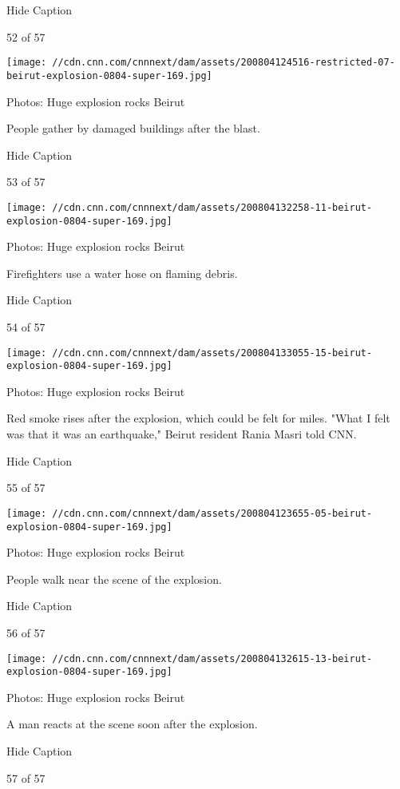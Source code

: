 Hide Caption

52 of 57

\texttt{[image: //cdn.cnn.com/cnnnext/dam/assets/200804124516-restricted-07-beirut-explosion-0804-super-169.jpg]}

Photos: Huge explosion rocks Beirut

People gather by damaged buildings after the blast.

Hide Caption

53 of 57

\texttt{[image: //cdn.cnn.com/cnnnext/dam/assets/200804132258-11-beirut-explosion-0804-super-169.jpg]}

Photos: Huge explosion rocks Beirut

Firefighters use a water hose on flaming debris.

Hide Caption

54 of 57

\texttt{[image: //cdn.cnn.com/cnnnext/dam/assets/200804133055-15-beirut-explosion-0804-super-169.jpg]}

Photos: Huge explosion rocks Beirut

Red smoke rises after the explosion, which could be felt for miles.
"What I felt was that it was an earthquake," Beirut resident Rania Masri
told CNN.

Hide Caption

55 of 57

\texttt{[image: //cdn.cnn.com/cnnnext/dam/assets/200804123655-05-beirut-explosion-0804-super-169.jpg]}

Photos: Huge explosion rocks Beirut

People walk near the scene of the explosion.

Hide Caption

56 of 57

\texttt{[image: //cdn.cnn.com/cnnnext/dam/assets/200804132615-13-beirut-explosion-0804-super-169.jpg]}

Photos: Huge explosion rocks Beirut

A man reacts at the scene soon after the explosion.

Hide Caption

57 of 57

